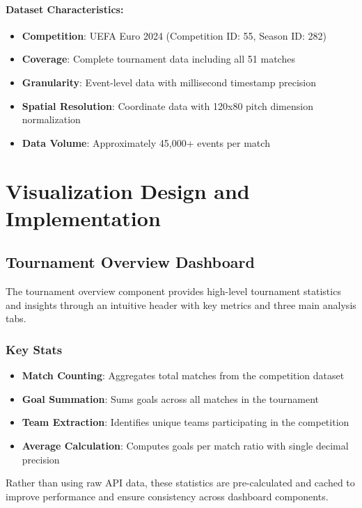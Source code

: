 \documentclass[12pt,a4paper]{article}
\begin{document}
\paragraph{Dataset Characteristics:}
\begin{itemize}
    \item \textbf{Competition}: UEFA Euro 2024 (Competition ID: 55, Season ID: 282)
    \item \textbf{Coverage}: Complete tournament data including all 51 matches
    \item \textbf{Granularity}: Event-level data with millisecond timestamp precision
    \item \textbf{Spatial Resolution}: Coordinate data with 120x80 pitch dimension normalization
    \item \textbf{Data Volume}: Approximately 45,000+ events per match
\end{itemize}

\section{Visualization Design and Implementation}

\subsection{Tournament Overview Dashboard}

The tournament overview component provides high-level tournament statistics and insights through an intuitive header with key metrics and three main analysis tabs.


\subsubsection{Key Stats}
\begin{itemize}
    \item \textbf{Match Counting}: Aggregates total matches from the competition dataset
    \item \textbf{Goal Summation}: Sums goals across all matches in the tournament
    \item \textbf{Team Extraction}: Identifies unique teams participating in the competition
    \item \textbf{Average Calculation}: Computes goals per match ratio with single decimal precision
\end{itemize}

Rather than using raw API data, these statistics are pre-calculated and cached to improve performance and ensure consistency across dashboard components.
\end{document}
